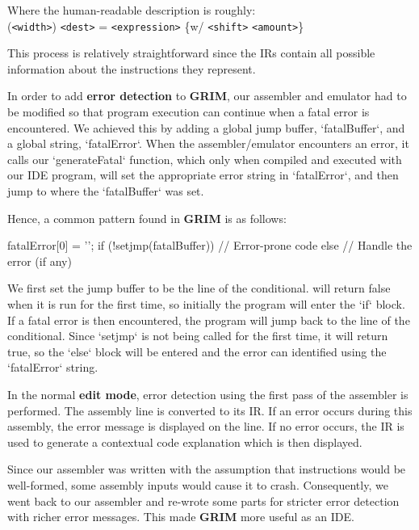 \documentclass{ictex}
\begin{document}
Where the human-readable description is roughly: \\

{ \vspace{-1.2em} \small \phantom{    } (\texttt{<width>}) \texttt{<dest>} = \texttt{<expression>} \{w/ \texttt{<shift>} \texttt{<amount>}\} }

This process is relatively straightforward since the IRs contain all possible information about the instructions they represent.

In order to add \textbf{error detection} to \textbf{GRIM}, our assembler and emulator had to be modified so that program execution can continue when a fatal error is encountered. We achieved this by adding a global jump buffer, `fatalBuffer`, and a global string, `fatalError`. When the assembler/emulator encounters an error, it calls our `generateFatal` function, which only when compiled and executed with our IDE program, will set the appropriate error string in `fatalError`, and then jump to where the `fatalBuffer` was set.

Hence, a common pattern found in \textbf{GRIM} is as follows:
\begin{code}
    fatalError[0] = '\0';
    if (!setjmp(fatalBuffer)) {
        // Error-prone code
    } else {
        // Handle the error (if any)
    }
\end{code}

We first set the jump buffer to be the line of the conditional.
 will return false when it is run for the first time, so initially the program will enter the `if` block. If a fatal error is then encountered, the program will jump back to the line of the conditional. Since `setjmp` is not being called for the first time, it will return true, so the `else` block will be entered and the error can identified using the `fatalError` string.

In the normal \textbf{edit mode}, error detection using the first pass of the assembler is performed. The assembly line is converted to its IR. If an error occurs during this assembly, the error message is displayed on the line. If no error occurs, the IR is used to generate a contextual code explanation which is then displayed.

Since our assembler was written with the assumption that instructions would be well-formed, some assembly inputs would cause it to crash. Consequently, we went back to our assembler and re-wrote some parts for stricter error detection with richer error messages. This made \textbf{GRIM} more useful as an IDE.
\end{document}
